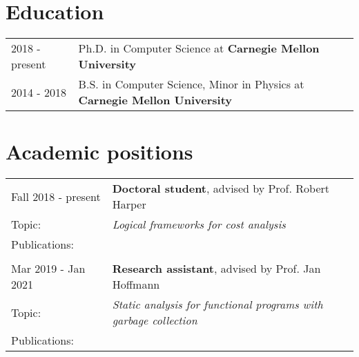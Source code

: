 \documentclass[a4paper,12pt]{article}
\begin{document}


\section{Education}
\begin{tabularx}{\linewidth}{@{}l X@{}}	
2018 - present & Ph.D. in Computer Science at \textbf{Carnegie Mellon University} \hfill \normalsize \\

2014 - 2018 & B.S. in Computer Science, Minor in Physics at \textbf{Carnegie Mellon University} \hfill 
\end{tabularx}

\section{Academic positions}

\begin{tabularx}{\linewidth}{ @{}l X@{} }
  Fall 2018 - present & \textbf{Doctoral student}, advised by Prof. Robert Harper \\[3.75pt]
  Topic: & \emph{Logical frameworks for cost analysis}\\
  Publications: &\citet{niu-harper:2020,niu-harper:2022,niu-sterling-grodin-harper:2022,grodin2023decalf}\\ \\ 
  Mar 2019 - Jan 2021 & \textbf{Research assistant}, advised by Prof. Jan Hoffmann \\[3.75pt]
  Topic: & \emph{Static analysis for functional programs with garbage collection}\\ 
  Publications: & \citet{niu-hoffmann:2018}
\end{tabularx}
\end{document}
